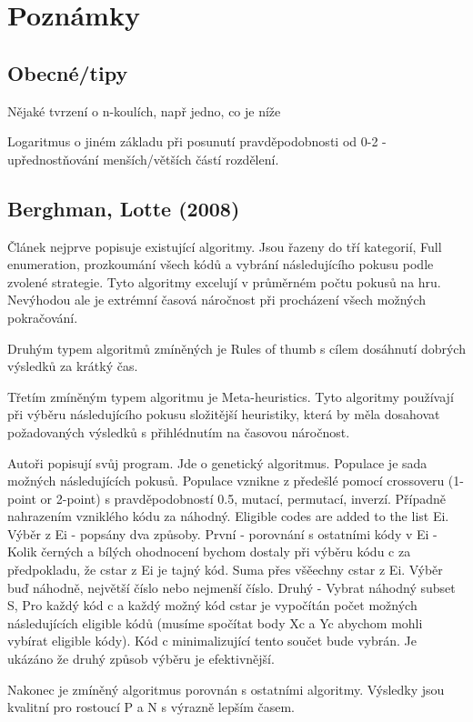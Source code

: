 \chapter{Poznámky}

\section{Obecné/tipy}
Nějaké tvrzení o n-koulích, např jedno, co je níže

Logaritmus o jiném základu při posunutí pravděpodobnosti od 0-2 - upřednostňování menších/větších částí rozdělení.

\section{Berghman, Lotte (2008) \cite{BERGHMAN20091880}}
Článek nejprve popisuje existující algoritmy. Jsou řazeny do tří kategorií, Full enumeration, prozkoumání všech kódů a vybrání následujícího pokusu podle zvolené strategie. Tyto algoritmy excelují v průměrném počtu pokusů na hru. Nevýhodou ale je extrémní časová náročnost při procházení všech možných pokračování. 

Druhým typem algoritmů zmíněných je Rules of thumb s cílem dosáhnutí dobrých výsledků za krátký čas. 

Třetím zmíněným typem algoritmu je Meta-heuristics. Tyto algoritmy používají při výběru následujícího pokusu složitější heuristiky, která by měla dosahovat požadovaných výsledků s přihlédnutím na časovou náročnost. 

Autoři popisují svůj program. Jde o genetický algoritmus. Populace je sada možných následujících pokusů. Populace vznikne z předešlé pomocí crossoveru (1-point or 2-point) s pravděpodobností 0.5, mutací, permutací, inverzí. Případně nahrazením vzniklého kódu za náhodný. Eligible codes are added to the list Ei. Výběr z Ei - popsány dva způsoby. První - porovnání s ostatními kódy v Ei - Kolik černých a bílých ohodnocení bychom dostaly při výběru kódu c za předpokladu, že cstar z Ei je tajný kód. Suma přes všěechny cstar z Ei. Výběr buď náhodně, největší číslo nebo nejmenší číslo. Druhý - Vybrat náhodný subset S, Pro každý kód c a každý možný kód cstar je vypočítán počet možných následujících eligible kódů (musíme spočítat body Xc a Yc abychom mohli vybírat eligible kódy). Kód c minimalizující tento součet bude vybrán. Je ukázáno že druhý způsob výběru je efektivnější. 

Nakonec je zmíněný algoritmus porovnán s ostatními algoritmy. Výsledky jsou kvalitní pro rostoucí P a N s výrazně lepším časem. 


